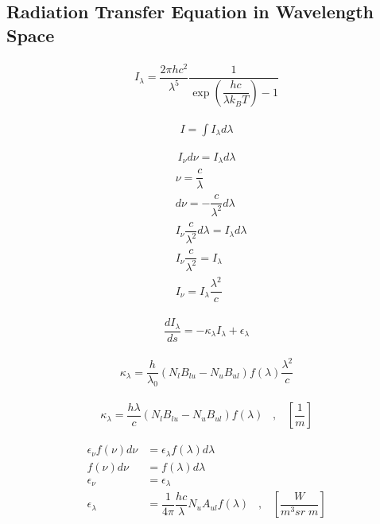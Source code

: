 \subsection{Radiation Transfer Equation in Wavelength Space}

\begin{align}
I_\lambda = \dfrac{2 \pi h c^2}{\lambda^5} \dfrac{1}{\exp\left(\dfrac{h c}{\lambda k_B T}\right) - 1}
\end{align}

\begin{align}
I = \int I_{\lambda} d\lambda
\end{align}

\begin{align}
I_{\nu} d\nu = I_{\lambda} d\lambda
\end{align}
\begin{align}
&\nu = \dfrac{c}{\lambda} \\
&d\nu = -\dfrac{c}{\lambda^2} d\lambda \\
&I_{\nu} \dfrac{c}{\lambda^2} d\lambda = I_{\lambda} d\lambda \\
&I_{\nu} \dfrac{c}{\lambda^2} = I_{\lambda} \\
&I_{\nu} = I_{\lambda} \dfrac{\lambda^2}{c}
\end{align}


\begin{align}
\dfrac{d I_{\lambda}}{ds} = - \kappa_\lambda I_{\lambda} + 	\epsilon_\lambda
\end{align}

\begin{align}
\kappa_\lambda = \dfrac{h}{\lambda_0} \left(N_l B_{lu} - N_u B_{ul}\right) f(\lambda) \dfrac{\lambda^2}{c}
\end{align}

\begin{align}
\kappa_\lambda = \dfrac{h \lambda}{c} \left(N_l B_{lu} - N_u B_{ul}\right) f(\lambda) 
\;\;\; , \;\;\; \left[\dfrac{1}{m}\right]
\end{align}

\begin{align}
\epsilon_\nu f(\nu) d \nu &= 	\epsilon_\lambda f(\lambda)  d\lambda \\
f(\nu) d \nu &= 	f(\lambda)  d\lambda \\
\epsilon_\nu &= \epsilon_\lambda \\
\epsilon_\lambda &= \dfrac{1}{4 \pi} \dfrac{h c}{\lambda} N_u A_{ul} f(\lambda) 
\;\;\; , \;\;\; \left[\dfrac{W}{m^3 sr \;m}\right]
\end{align}

